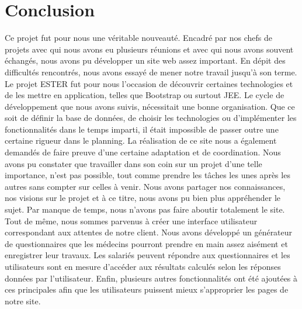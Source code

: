 \chapter*{Conclusion}

Ce projet fut pour nous une véritable nouveauté. Encadré par nos chefs de projets avec qui nous avons eu plusieurs réunions et avec qui nous avons souvent échangés, nous avons pu développer un site web assez important. En dépit des difficultés rencontrés, nous avons essayé de mener notre travail jusqu'à son terme. Le projet ESTER fut pour nous l'occasion de découvrir certaines technologies et de les mettre en application, telles que Bootstrap ou surtout JEE. Le cycle de développement que nous avons suivis, nécessitait une bonne organisation. Que ce soit de définir la base de données, de choisir les technologies ou d'implémenter les fonctionnalités dans le temps imparti, il était impossible de passer outre une certaine rigueur dans le planning. La réalisation de ce site nous a également demandés de faire preuve d'une certaine adaptation et de coordination. 
Nous avons pu constater que travailler dans son coin sur un projet d'une telle importance, n'est pas possible, tout comme prendre les tâches les unes après les autres sans compter sur celles à venir. Nous avons partager nos connaissances, nos visions sur le projet et à ce titre, nous avons pu bien plus appréhender le sujet. Par manque de temps, nous n'avons pas faire aboutir totalement le site. Tout de même, nous sommes parvenus à créer une interface utilisateur correspondant aux attentes de notre client. Nous avons développé un générateur de questionnaires que les médecins pourront prendre en main assez aisément et enregistrer leur travaux. Les salariés peuvent répondre aux questionnaires et les utilisateurs sont en mesure d'accéder aux résultats calculés selon les réponses données par l'utilisateur. Enfin, plusieurs autres fonctionnalités ont été ajoutées à ces principales afin que les utilisateurs puissent mieux s'approprier les pages de notre site.